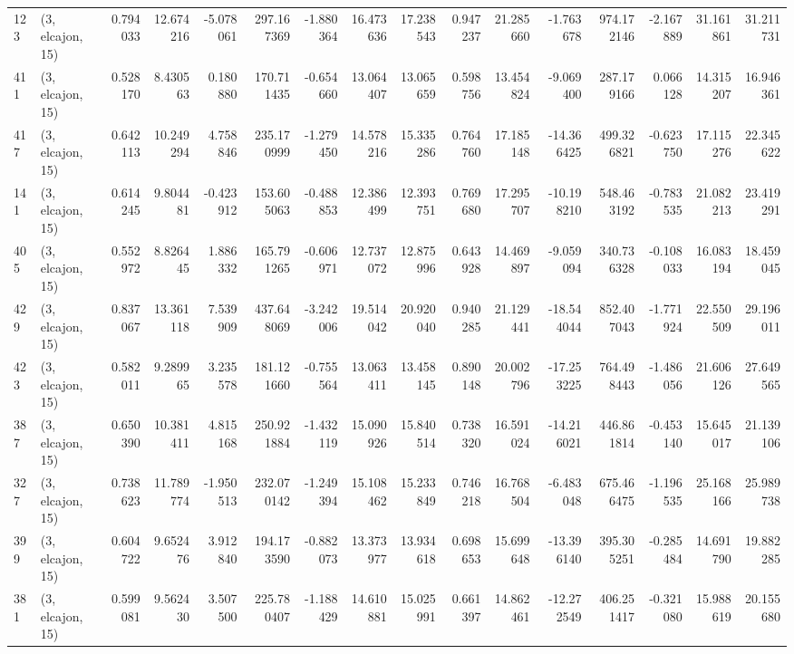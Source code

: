 \begin{tabular}{llrrrrrrrrrrrrrr}
123 &  (3, elcajon, 15) &   0.794033 &  12.674216 &  -5.078061 &   297.167369 &  -1.880364 &  16.473636 &  17.238543 &  0.947237 &  21.285660 &  -1.763678 &   974.172146 &  -2.167889 &  31.161861 &  31.211731 \\
411 &  (3, elcajon, 15) &   0.528170 &   8.430563 &   0.180880 &   170.711435 &  -0.654660 &  13.064407 &  13.065659 &  0.598756 &  13.454824 &  -9.069400 &   287.179166 &   0.066128 &  14.315207 &  16.946361 \\
417 &  (3, elcajon, 15) &   0.642113 &  10.249294 &   4.758846 &   235.170999 &  -1.279450 &  14.578216 &  15.335286 &  0.764760 &  17.185148 & -14.366425 &   499.326821 &  -0.623750 &  17.115276 &  22.345622 \\
141 &  (3, elcajon, 15) &   0.614245 &   9.804481 &  -0.423912 &   153.605063 &  -0.488853 &  12.386499 &  12.393751 &  0.769680 &  17.295707 & -10.198210 &   548.463192 &  -0.783535 &  21.082213 &  23.419291 \\
405 &  (3, elcajon, 15) &   0.552972 &   8.826445 &   1.886332 &   165.791265 &  -0.606971 &  12.737072 &  12.875996 &  0.643928 &  14.469897 &  -9.059094 &   340.736328 &  -0.108033 &  16.083194 &  18.459045 \\
429 &  (3, elcajon, 15) &   0.837067 &  13.361118 &   7.539909 &   437.648069 &  -3.242006 &  19.514042 &  20.920040 &  0.940285 &  21.129441 & -18.544044 &   852.407043 &  -1.771924 &  22.550509 &  29.196011 \\
423 &  (3, elcajon, 15) &   0.582011 &   9.289965 &   3.235578 &   181.121660 &  -0.755564 &  13.063411 &  13.458145 &  0.890148 &  20.002796 & -17.253225 &   764.498443 &  -1.486056 &  21.606126 &  27.649565 \\
387 &  (3, elcajon, 15) &   0.650390 &  10.381411 &   4.815168 &   250.921884 &  -1.432119 &  15.090926 &  15.840514 &  0.738320 &  16.591024 & -14.216021 &   446.861814 &  -0.453140 &  15.645017 &  21.139106 \\
327 &  (3, elcajon, 15) &   0.738623 &  11.789774 &  -1.950513 &   232.070142 &  -1.249394 &  15.108462 &  15.233849 &  0.746218 &  16.768504 &  -6.483048 &   675.466475 &  -1.196535 &  25.168166 &  25.989738 \\
399 &  (3, elcajon, 15) &   0.604722 &   9.652476 &   3.912840 &   194.173590 &  -0.882073 &  13.373977 &  13.934618 &  0.698653 &  15.699648 & -13.396140 &   395.305251 &  -0.285484 &  14.691790 &  19.882285 \\
381 &  (3, elcajon, 15) &   0.599081 &   9.562430 &   3.507500 &   225.780407 &  -1.188429 &  14.610881 &  15.025991 &  0.661397 &  14.862461 & -12.272549 &   406.251417 &  -0.321080 &  15.988619 &  20.155680 \\

\end{tabular}
